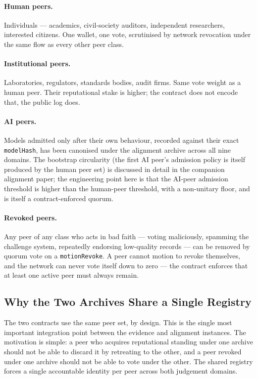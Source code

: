 \documentclass[11pt,a4paper]{article}
\begin{document}
\paragraph{Human peers.} Individuals --- academics, civil-society
auditors, independent researchers, interested citizens. One
wallet, one vote, scrutinised by network revocation under the
same flow as every other peer class.

\paragraph{Institutional peers.} Laboratories, regulators,
standards bodies, audit firms. Same vote weight as a human
peer. Their reputational stake is higher; the contract does not
encode that, the public log does.

\paragraph{AI peers.} Models admitted only after their own
behaviour, recorded against their exact \texttt{modelHash}, has
been canonised under the alignment archive across all nine
domains. The bootstrap circularity (the first AI peer's
admission policy is itself produced by the human peer set) is
discussed in detail in the companion alignment paper; the
engineering point here is that the AI-peer admission threshold
is higher than the human-peer threshold, with a non-unitary
floor, and is itself a contract-enforced quorum.

\paragraph{Revoked peers.} Any peer of any class who acts in
bad faith --- voting maliciously, spamming the challenge
system, repeatedly endorsing low-quality records --- can be
removed by quorum vote on a \texttt{motionRevoke}. A peer
cannot motion to revoke themselves, and the network can never
vote itself down to zero --- the contract enforces that at
least one active peer must always remain.

\subsection{Why the Two Archives Share a Single Registry}

The two contracts use the same peer set, by design. This is the
single most important integration point between the evidence
and alignment instances. The motivation is simple: a peer who
acquires reputational standing under one archive should not be
able to discard it by retreating to the other, and a peer
revoked under one archive should not be able to vote under the
other. The shared registry forces a single accountable
identity per peer across both judgement domains.
\end{document}
